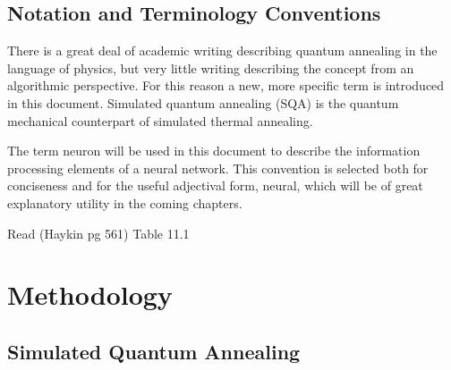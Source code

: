 \documentclass[11pt]{afthesis}
\begin{document}



\section{Notation and Terminology Conventions}

There is a great deal of academic writing describing quantum annealing in the language of physics, but very little writing describing the concept from an algorithmic perspective. For this reason a new, more specific term is introduced in this document. Simulated quantum annealing (SQA) is the quantum mechanical counterpart of simulated thermal annealing. 


The term neuron will be used in this document to describe the information processing elements of a neural network. This convention is selected both for conciseness and for the useful adjectival form, neural, which will be of great explanatory utility in the coming chapters.


Read (Haykin pg 561) Table 11.1


\chapter{Methodology}

\section{Simulated Quantum Annealing}
\end{document}
